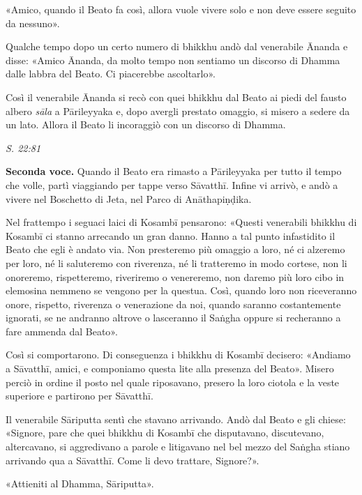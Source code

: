 «Amico, quando il Beato fa così, allora vuole vivere solo e non deve
essere seguito da nessuno».


Qualche tempo dopo un certo numero di bhikkhu andò dal venerabile Ānanda
e disse: «Amico Ānanda, da molto tempo non sentiamo un discorso di
Dhamma dalle labbra del Beato. Ci piacerebbe ascoltarlo».


Così il venerabile Ānanda si recò con quei bhikkhu dal Beato ai piedi
del fausto albero \emph{sāla} a Pārileyyaka e, dopo avergli prestato omaggio,
si misero a sedere da un lato. Allora il Beato li incoraggiò con un
discorso di Dhamma.


\emph{S. 22:81}


\textbf{Seconda voce.} Quando il Beato era rimasto a Pārileyyaka per tutto il
tempo che volle, partì viaggiando per tappe verso Sāvatthī. Infine vi
arrivò, e andò a vivere nel Boschetto di Jeta, nel Parco di
Anāthapiṇḍika.


Nel frattempo i seguaci laici di Kosambī pensarono: «Questi venerabili
bhikkhu di Kosambī ci stanno arrecando un gran danno. Hanno a tal punto
infastidito il Beato che egli è andato via. Non presteremo più omaggio a
loro, né ci alzeremo per loro, né li saluteremo con riverenza, né li
tratteremo in modo cortese, non li onoreremo, rispetteremo, riveriremo o
venereremo, non daremo più loro cibo in elemosina nemmeno se vengono per
la questua. Così, quando loro non riceveranno onore, rispetto, riverenza
o venerazione da noi, quando saranno costantemente ignorati, se ne
andranno altrove o lasceranno il Saṅgha oppure si recheranno a fare
ammenda dal Beato».


Così si comportarono. Di conseguenza i bhikkhu di Kosambī decisero:
«Andiamo a Sāvatthī, amici, e componiamo questa lite alla presenza del
Beato». Misero perciò in ordine il posto nel quale riposavano, presero
la loro ciotola e la veste superiore e partirono per Sāvatthī.


Il venerabile Sāriputta sentì che stavano arrivando. Andò dal Beato e
gli chiese: «Signore, pare che quei bhikkhu di Kosambī che disputavano,
discutevano, altercavano, si aggredivano a parole e litigavano nel bel
mezzo del Saṅgha stiano arrivando qua a Sāvatthī. Come li devo trattare,
Signore?».


«Attieniti al Dhamma, Sāriputta».


